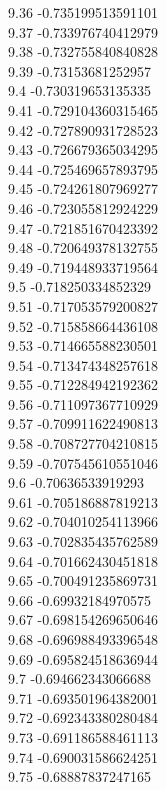 {9.36	-0.735199513591101\\
9.37	-0.733976740412979\\
9.38	-0.732755840840828\\
9.39	-0.73153681252957\\
9.4	-0.730319653135335\\
9.41	-0.729104360315465\\
9.42	-0.727890931728523\\
9.43	-0.726679365034295\\
9.44	-0.725469657893795\\
9.45	-0.724261807969277\\
9.46	-0.723055812924229\\
9.47	-0.721851670423392\\
9.48	-0.720649378132755\\
9.49	-0.719448933719564\\
9.5	-0.718250334852329\\
9.51	-0.717053579200827\\
9.52	-0.715858664436108\\
9.53	-0.714665588230501\\
9.54	-0.713474348257618\\
9.55	-0.712284942192362\\
9.56	-0.711097367710929\\
9.57	-0.709911622490813\\
9.58	-0.708727704210815\\
9.59	-0.707545610551046\\
9.6	-0.70636533919293\\
9.61	-0.705186887819213\\
9.62	-0.704010254113966\\
9.63	-0.702835435762589\\
9.64	-0.701662430451818\\
9.65	-0.700491235869731\\
9.66	-0.69932184970575\\
9.67	-0.698154269650646\\
9.68	-0.696988493396548\\
9.69	-0.695824518636944\\
9.7	-0.694662343066688\\
9.71	-0.693501964382001\\
9.72	-0.692343380280484\\
9.73	-0.691186588461113\\
9.74	-0.690031586624251\\
9.75	-0.68887837247165\\
}
